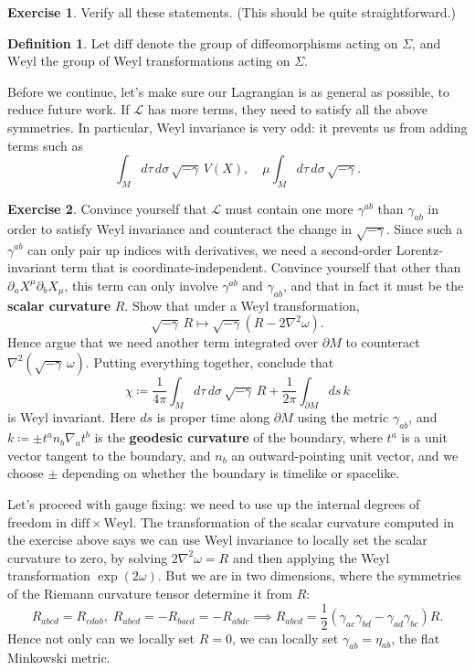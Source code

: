 \documentclass{report}
\theoremstyle{plain}
\theoremstyle{definition}
\newtheorem{definition}[theorem]{Definition}
\newtheorem{exercise}{Exercise}[section]
\theoremstyle{remark}
\newcommand{\di}{\partial}
\newcommand{\cL}{\mathcal{L}}
\newcommand{\diff}{\mathrm{diff}}
\newcommand{\Weyl}{\mathrm{Weyl}}
\begin{document}
\begin{exercise}
  Verify all these statements. (This should be quite straightforward.)
\end{exercise}

\begin{definition}
  Let $\diff$ denote the group of diffeomorphisms acting on $\Sigma$,
  and $\Weyl$ the group of Weyl transformations acting on $\Sigma$.
\end{definition}

Before we continue, let's make sure our Lagrangian is as general as
possible, to reduce future work. If $\cL$ has more terms, they need to
satisfy all the above symmetries. In particular, Weyl invariance is
very odd: it prevents us from adding terms such as
\[ \int_M d\tau \, d\sigma \, \sqrt{-\gamma} \, V(X), \quad \mu \int_M d\tau \, d\sigma \, \sqrt{-\gamma}. \]

\begin{exercise}
  Convince yourself that $\cL$ must contain one more $\gamma^{ab}$
  than $\gamma_{ab}$ in order to satisfy Weyl invariance and
  counteract the change in $\sqrt{-\gamma}$. Since such a
  $\gamma^{ab}$ can only pair up indices with derivatives, we need a
  second-order Lorentz-invariant term that is coordinate-independent.
  Convince yourself that other than $\di_a X^\mu \di_b X_\mu$, this
  term can only involve $\gamma^{ab}$ and $\gamma_{ab}$, and that in
  fact it must be the {\bf scalar curvature} $R$. Show that under a
  Weyl transformation,
  \[ \sqrt{-\gamma} \, R \mapsto \sqrt{-\gamma} (R - 2\nabla^2 \omega). \]
  Hence argue that we need another term integrated over $\di M$ to
  counteract $\nabla^2(\sqrt{-\gamma} \, \omega)$. Putting everything
  together, conclude that
  \[ \chi \coloneqq \frac{1}{4\pi} \int_M d\tau \, d\sigma \, \sqrt{-\gamma} \, R + \frac{1}{2\pi} \int_{\di M} ds \, k \]
  is Weyl invariant. Here $ds$ is proper time along $\di M$ using the
  metric $\gamma_{ab}$, and $k \coloneqq \pm t^a n_b \nabla_a t^b$ is
  the {\bf geodesic curvature} of the boundary, where $t^a$ is a unit
  vector tangent to the boundary, and $n_b$ an outward-pointing unit
  vector, and we choose $\pm$ depending on whether the boundary is
  timelike or spacelike.
\end{exercise}

Let's proceed with gauge fixing: we need to use up the internal
degrees of freedom in $\diff \times \Weyl$. The transformation of the
scalar curvature computed in the exercise above says we can use Weyl
invariance to locally set the scalar curvature to zero, by solving
$2\nabla^2\omega = R$ and then applying the Weyl transformation
$\exp(2\omega)$. But we are in two dimensions, where the symmetries of
the Riemann curvature tensor determine it from $R$:
\[ R_{abcd} = R_{cdab}, \; R_{abcd} = -R_{bacd} = -R_{abdc} \implies R_{abcd} = \frac{1}{2}(\gamma_{ac}\gamma_{bd} - \gamma_{ad}\gamma_{bc}) R. \]
Hence not only can we locally set $R = 0$, we can locally set
$\gamma_{ab} = \eta_{ab}$, the flat Minkowski metric.
\end{document}
